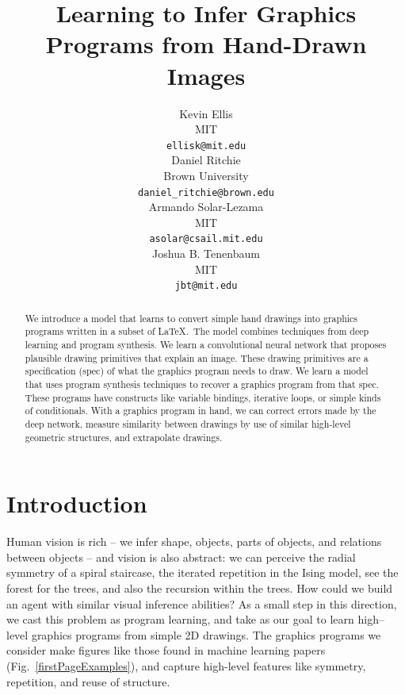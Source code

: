 \documentclass{article}
\title{Learning to Infer Graphics Programs from Hand-Drawn Images}
\author{Kevin Ellis\\MIT\\\texttt{ellisk@mit.edu}\\
 \And
 Daniel Ritchie\\Brown University\\\texttt{daniel\_ritchie@brown.edu}\\
 \AND
 Armando Solar-Lezama\\MIT\\\texttt{asolar@csail.mit.edu}\\
 \And
 Joshua B. Tenenbaum \\MIT\\\texttt{jbt@mit.edu}\\
}
\theoremstyle{definition}
\begin{document}

\maketitle

\begin{abstract}
  We introduce a model that learns to convert simple hand drawings
  into graphics programs written in a subset of \LaTeX.~The model
  combines techniques from deep learning and program synthesis.  We
  learn a convolutional neural network that proposes plausible drawing
  primitives that explain an image. These drawing primitives are a
  specification (spec) of what the graphics program needs to draw.  We
  learn a model that uses program synthesis techniques to recover a
  graphics program from that spec. These programs have constructs like
  variable bindings, iterative loops, or simple kinds of
  conditionals. With a graphics program in hand, we can correct errors
  made by the deep network, measure similarity between drawings by use of similar high-level geometric structures, and extrapolate drawings.
\end{abstract}
\vspace{-0.3cm}
\section{Introduction}

Human vision is rich -- we infer shape, objects, parts of objects,
and relations between objects -- and vision is also abstract:
we can perceive the radial symmetry of a spiral staircase,
the iterated repetition in the Ising model,
see the forest for the trees, and also the recursion within the trees.
How could we build an agent with similar visual inference abilities?
As a small step in this direction, 
we cast this problem as program learning,
and take as our goal to learn high--level
graphics programs from simple 2D drawings.
The graphics programs we consider make figures like those found in machine learning papers
(Fig.~\ref{firstPageExamples}),
and capture high-level features like %
symmetry, repetition, and reuse of structure.

\end{document}
